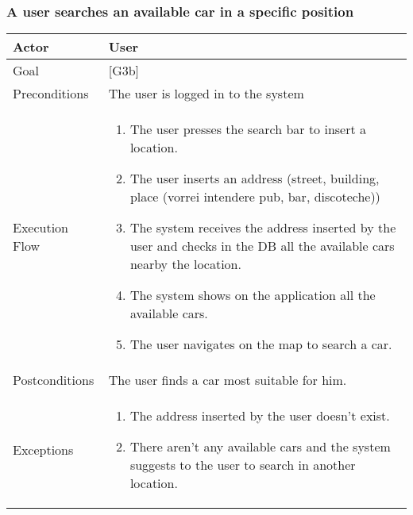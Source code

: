 \documentclass{article}
\begin{document}
	\subsubsection{A user searches an available car in a specific position}
	\begin{tabularx}{\textwidth}{  l  X  }
		\hline
		Actor & User\\
		\hline
		Goal & [G3b]\\
		\hline
		Preconditions & The user is logged in to the system\\
		\hline
		Execution Flow & \begin{enumerate}
			\item{The user presses the search bar to insert a location.}
										 \item{The user inserts an address (street, building, place (vorrei intendere pub, bar, discoteche))}
										 \item{The system receives the address inserted by the user and checks in the DB all the available cars nearby the location.}
										 \item{The system shows on the application all the available cars.}
										 \item{The user navigates on the map to search a car.}
										\end{enumerate}\\
		\hline
		Postconditions & The user finds a car most suitable for him.\\
		\hline
		Exceptions & \begin{enumerate}
				\item{The address inserted by the user doesn't exist.}
								 \item{There aren't any available cars and the system suggests to the user to search in another location.}
					\end{enumerate}\\
		\hline
	\end{tabularx}
\end{document}
